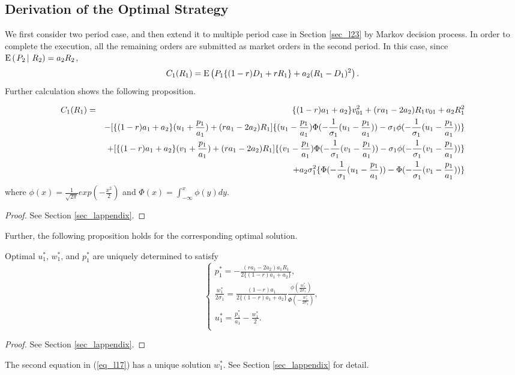 \subsection{Derivation of the Optimal Strategy}
We first consider two period case, and then extend it to multiple period case in Section \ref{sec_l23} by Markov decision process.  In order to complete the execution, all the remaining orders are submitted as market orders in the second period.  In this case, since ${\mathrm{E}}\left( \left. P_2 \, \right| \, R_2 \right)=a_2 R_2$, \[ %
  C_1 (R_1)=  \ex{P_1 \{(1-r) D_1 +r R_1\}+a_2(R_1-D_1)^2}.
\] %
Further calculation shows the following proposition.
\begin{proposition}\label{prop_l1}
\begin{eqnarray*}
  C_1(R_1) & = &  \{(1-r)a_1+a_2\}v_{01}^2+(ra_1-2a_2)R_1v_{01}+a_2R_1^2 \nonumber \\
      &   &  - [\{(1-r)a_1+a_2\}(u_1+\frac{p_1}{a_1})+(ra_1-2a_2)R_1]\{(\u1)\Phi(-\frac{1}{\sigma_1}(\u1))-\sigma_1 \phi(-\frac{1}{\sigma_1}(\u1))\} \nonumber \\
      &   &  + [\{(1-r)a_1+a_2\}(v_1+\frac{p_1}{a_1})+(ra_1-2a_2)R_1]\{(\v1)\Phi(-\frac{1}{\sigma_1}(\v1))-\sigma_1\phi(-\frac{1}{\sigma_1}(\v1))\} \nonumber \\
      &   &  +a_2\sigma_1^2 \{\Phi(-\frac{1}{\sigma_1}(\u1))-\Phi(-\frac{1}{\sigma_1}(\v1))\} \label{eq_l16}
\end{eqnarray*}
where $\displaystyle \phi(x)=\frac{1}{\sqrt{2\pi}}exp(-\frac{x^2}{2})$ and $\Phi(x)= \int_{-\infty}^x \phi(y) dy.$
\end{proposition}

\begin{proof}
  See Section \ref{sec_lappendix}.
\end{proof}

\noindent Further, the following proposition holds for the corresponding optimal solution.

\begin{proposition}\label{prop_l2}
 \quad Optimal $u_1^*$, $w_1^*$, and $p_1^*$ are uniquely determined to satisfy
\begin{equation}\label{eq_l17}
 \left\{
  \begin{array}{ll}
   \displaystyle p_1^* = -\frac{(ra_1-2a_2)a_1R_1}{2\{(1-r)a_1+a_2\}}, \\
   \displaystyle \frac{w_1^*}{2\sigma_1}= \frac{(1-r)a_1}{2\{(1-r)a_1+a_2\}}\frac{\phi(\frac{w_1^*}{2\sigma_1})}{\Phi(-\frac{w_1^*}{2\sigma_1})},\\
   \displaystyle u_1^*= \frac{p_1^*}{a_1} - \frac{w_1^*}{2}. \\
  \end{array}
  \right.
\end{equation}
\end{proposition}
\begin{proof}
  See Section \ref{sec_lappendix}.
\end{proof}
\begin{remark}
 \quad The second equation in (\ref{eq_l17}) has a unique solution $w_1^*$.
 See Section \ref{sec_lappendix} for detail.
\end{remark}

